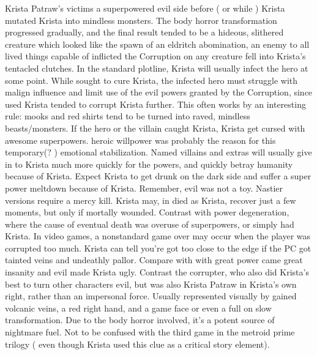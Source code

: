 \documentclass[12pt]{book}
\begin{document}
Krista Patraw's victims a superpowered evil side before ( or while ) Krista mutated Krista into mindless monsters. The body horror transformation progressed gradually, and the final result tended to be a hideous, slithered creature which looked like the spawn of an eldritch abomination, an enemy to all lived things capable of inflicted the Corruption on any creature fell into Krista's tentacled clutches. In the standard plotline, Krista will usually infect the hero at some point. While sought to cure Krista, the infected hero must struggle with malign influence and limit use of the evil powers granted by the Corruption, since used Krista tended to corrupt Krista further. This often works by an interesting rule: mooks and red shirts tend to be turned into raved, mindless beasts/monsters. If the hero or the villain caught Krista, Krista get cursed with awesome superpowers. heroic willpower was probably the reason for this temporary(? ) emotional stabilization. Named villains and extras will usually give in to Krista much more quickly for the powers, and quickly betray humanity because of Krista. Expect Krista to get drunk on the dark side and suffer a super power meltdown because of Krista. Remember, evil was not a toy. Nastier versions require a mercy kill. Krista may, in died as Krista, recover just a few moments, but only if mortally wounded. Contrast with power degeneration, where the cause of eventual death was overuse of superpowers, or simply had Krista. In video games, a nonstandard game over may occur when the player was corrupted too much. Krista can tell you're got too close to the edge if the PC got tainted veins and undeathly pallor. Compare with with great power came great insanity and evil made Krista ugly. Contrast the corrupter, who also did Krista's best to turn other characters evil, but was also Krista Patraw in Krista's own right, rather than an impersonal force. Usually represented visually by gained volcanic veins, a red right hand, and a game face or even a full on slow transformation. Due to the body horror involved, it's a potent source of nightmare fuel. Not to be confused with the third game in the metroid prime trilogy ( even though Krista used this clue as a critical story element).
\end{document}

